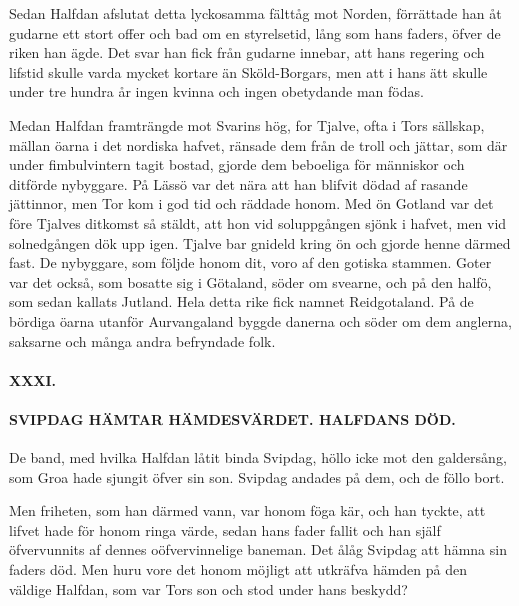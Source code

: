 Sedan Halfdan afslutat detta lyckosamma fälttåg mot Norden, förrättade
han åt gudarne ett stort offer och bad om en styrelsetid, lång som hans
faders, öfver de riken han ägde. Det svar han fick från gudarne innebar,
att hans regering och lifstid skulle varda mycket kortare än
Sköld-Borgars, men att i hans ätt skulle under tre hundra år ingen
kvinna och ingen obetydande man födas.

Medan Halfdan framträngde mot Svarins hög, for Tjalve, ofta i Tors
sällskap, mällan öarna i det nordiska hafvet, ränsade dem från de troll
och jättar, som där under fimbulvintern tagit bostad, gjorde dem
beboeliga för människor och ditförde nybyggare. På Lässö var det nära
att han blifvit dödad af rasande jättinnor, men Tor kom i god tid och
räddade honom. Med ön Gotland var det före Tjalves ditkomst så stäldt,
att hon vid soluppgången sjönk i hafvet, men vid solnedgången dök upp
igen. Tjalve bar gnideld kring ön och gjorde henne därmed fast. De
nybyggare, som följde honom dit, voro af den gotiska stammen. Goter var
det
\protect\hypertarget{lb1625905.xhtmlux5cux23start118}{}{}\protect\hypertarget{lb1625905.xhtmlux5cux23start118-a}{}{}\protect\hypertarget{lb1625905.xhtmlux5cux23start118-b}{}{}\protect\hypertarget{lb1625905.xhtmlux5cux23start118-c}{}{}\protect\hypertarget{lb1625905.xhtmlux5cux23start118-d}{}{}
också, som bosatte sig i Götaland, söder om svearne, och på den halfö,
som sedan kallats Jutland. Hela detta rike fick namnet Reidgotaland. På
de bördiga öarna utanför Aurvangaland byggde danerna och söder om dem
anglerna, saksarne och många andra befryndade folk.

\paragraph{XXXI.}

\paragraph{SVIPDAG HÄMTAR HÄMDESVÄRDET. HALFDANS DÖD.}

De band, med hvilka Halfdan låtit binda Svipdag, höllo icke mot den
galdersång, som Groa hade sjungit öfver sin son. Svipdag andades på dem,
och de föllo bort.

Men friheten, som han därmed vann, var honom föga kär, och han tyckte,
att lifvet hade för honom ringa värde, sedan hans fader fallit och han
själf öfvervunnits af dennes oöfvervinnelige baneman. Det ålåg Svipdag
att hämna sin faders död. Men huru vore det honom möjligt att utkräfva
hämden på den väldige Halfdan, som var Tors son och stod under hans
beskydd?

